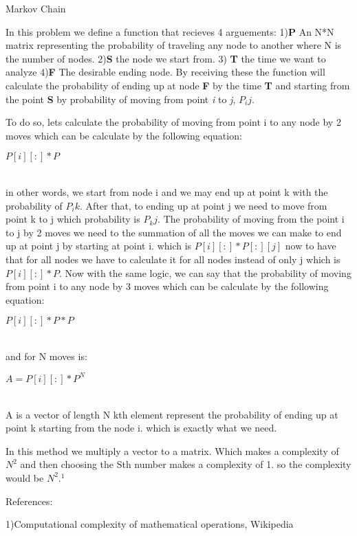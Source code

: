 \documentclass[a4 paper]{article}
\begin{document}
 Markov Chain
\vskip 5mm
\solution{}

In this problem we define a function that recieves 4 arguements: 1)\textbf{P} An N*N matrix representing the probability of traveling any node to another where N is the number of nodes. 2)\textbf{S} the node we start from. 3) \textbf{T} the time we want to analyze 4)\textbf{F} The desirable ending node. By receiving  these the function will calculate the probability of ending up at node \textbf{F} by the time \textbf{T} and starting from the point \textbf{S} by probability of moving from point \textit{i} to \textit{j}, $P_ij$.

To do so, lets calculate the probability of moving from point i to any node by 2 moves which can be calculate by the following equation:

\begin{center}
$P[i][:] *P$
\end{center}
\\
in other words, we start from node i and we may end up at point k with the probability of $P_ik$. After that, to ending up at point j we need to move from point k to j which probability is $P_kj$. The probability of moving from the point i to j by 2 moves we need to the summation of all the moves we can make to end up at point j by starting at point i. which is $P[i][:] *P[:][j]$ now to have that for all nodes we have to calculate it for all nodes instead of only j which is $P[i][:] *P$. Now with the same logic, we can say that the probability of moving from point i to any node by 3 moves which can be calculate by the following equation:

\begin{center}
$P[i][:] * P * P$
\end{center}
\\
and for N moves is:

\begin{center}
$A=P[i][:] * P^N$
\end{center}
\\
A is a vector of length N kth element represent the probability of ending up at point k starting from the node i. which is exactly what we need.

\complexity


In this method we multiply a vector to a matrix. Which makes a complexity of $N^2$ and then choosing the Sth number makes a complexity of 1. so the complexity would be $N^2$.$^1$


References:

1)Computational complexity of mathematical operations, Wikipedia
\vspace{60mm}
\end{document}
